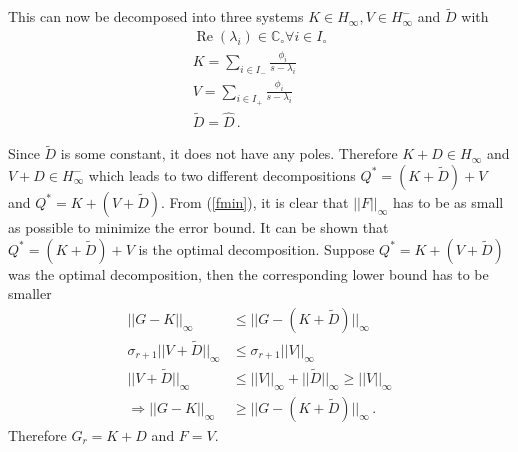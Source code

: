 This can now be decomposed into three systems \(K \in H_\infty, V \in H_{\infty}^-\) and \(\tilde{D}\) with
\begin{gather}
\operatorname{Re}(\lambda_i) \in \mathbb{C}_{\circ} \forall i \in I_{\circ} \\
K = \sum_{i \in I_-} \frac{\phi_i}{s-\lambda_i} \\
V = \sum_{i \in I_+} \frac{\phi_i}{s-\lambda_i} \\
\tilde{D} = \hat{D} \,.
\end{gather}

Since \(\tilde{D}\) is some constant, it does not have any poles.
Therefore \(K + D \in H_\infty\) and \(V + D \in H_{\infty}^-\) which leads to two different decompositions \(Q^{*} = (K + \tilde{D}) + V \) and \(Q^{*} = K + (V + \tilde{D})\).
From (\ref{fmin}), it is clear that \(||F||_{\infty}\) has to be as small as possible to minimize the error bound.
It can be shown that \(Q^{*} = (K + \tilde{D}) + V \) is the optimal decomposition.
Suppose \(Q^{*} = K + (V + \tilde{D})\) was the optimal decomposition, then the corresponding lower bound has to be smaller
\begin{align}
||G-K||_{\infty} &\leq ||G-(K+\tilde{D})||_{\infty} \\
\sigma_{r+1}||V + \tilde{D}||_{\infty} &\leq \sigma_{r+1}||V||_{\infty} \\
||V + \tilde{D}||_{\infty} &\leq ||V||_{\infty} + ||\tilde{D}||_{\infty} \geq ||V||_{\infty} \\
\Rightarrow ||G-K||_{\infty} &\geq ||G-(K+\tilde{D})||_{\infty} \,.
\end{align}
Therefore \(G_r = K + D\) and \(F = V\).

